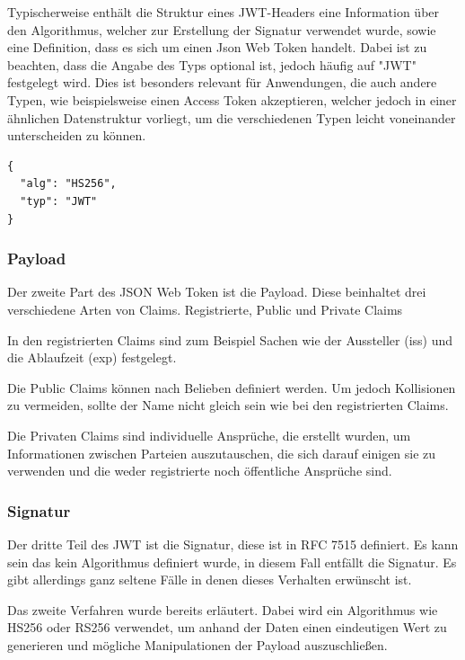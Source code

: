 Typischerweise enthält die Struktur eines JWT-Headers eine Information über den Algorithmus, welcher zur Erstellung der Signatur verwendet wurde, sowie eine Definition, dass es sich um einen Json Web Token handelt. Dabei ist zu beachten, dass die Angabe des Typs optional ist, jedoch häufig auf "JWT" festgelegt wird. Dies ist besonders relevant für Anwendungen, die auch andere Typen, wie beispielsweise einen Access Token akzeptieren, welcher jedoch in einer ähnlichen Datenstruktur vorliegt, um die verschiedenen Typen leicht voneinander unterscheiden zu können.

\begin{lstlisting}
{
  "alg": "HS256",
  "typ": "JWT"
}
\end{lstlisting}

\subsubsection{Payload}
Der zweite Part des JSON Web Token ist die Payload. Diese beinhaltet drei verschiedene Arten von Claims. 
Registrierte, Public und Private Claims

In den registrierten Claims sind zum Beispiel Sachen wie der Aussteller (iss) und die Ablaufzeit (exp) festgelegt.

Die Public Claims können nach Belieben definiert werden. Um jedoch Kollisionen zu vermeiden, sollte der Name nicht gleich sein wie bei den registrierten Claims.

Die Privaten Claims sind individuelle Ansprüche, die erstellt wurden, um Informationen zwischen Parteien auszutauschen, die sich darauf einigen sie zu verwenden und die weder registrierte noch öffentliche Ansprüche sind.


\subsubsection{Signatur}

Der dritte Teil des JWT ist die Signatur, diese ist in RFC 7515 definiert. Es kann sein das kein Algorithmus definiert wurde, in diesem Fall entfällt die Signatur. Es gibt allerdings ganz seltene Fälle in denen dieses Verhalten erwünscht ist. 



Das zweite Verfahren wurde bereits erläutert. Dabei wird ein Algorithmus wie HS256 oder RS256 verwendet, um anhand der Daten einen eindeutigen Wert zu generieren und mögliche Manipulationen der Payload auszuschließen.



